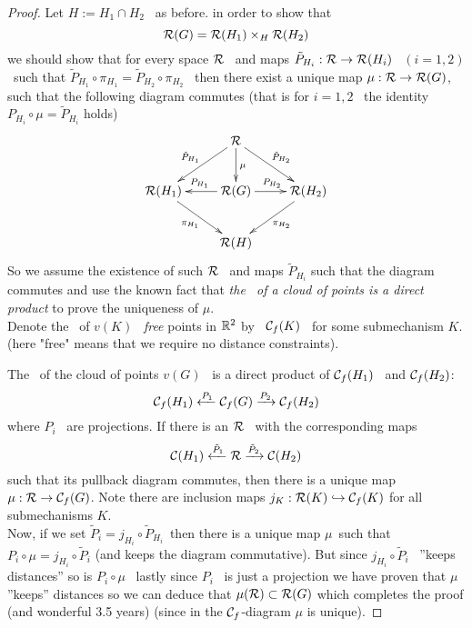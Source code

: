 \begin{proof}


Let $H:=H_1 \cap H_2$ \ as before. in order to show that
$$\mathcal{R}(G)=\mathcal{R}(H_1)\times_{H} \mathcal{R}(H_2)$$
we should show that for every space $\mathcal{R}$ \ and maps
$\tilde{P}_{H_i}:\mathcal{R} \rightarrow \mathcal{R}(H_i)$  \ $(i=1,2)$ \ such that
$\tilde{P}_{H_1}\circ \pi_{H_1}=\tilde{P}_{H_2}\circ \pi_{H_2}$ \
then there exist a unique map $\mu:\mathcal{R} \rightarrow \mathcal{R}(G)$, such
that the following diagram commutes (that is for $i=1,2$ \ the
identity $P_{H_i}\circ\mu=\tilde{P}_{H_i}$ holds)
$$
\xymatrix@R=25pt{ \hspace*{3.5mm} & \ar[dl]_{\tilde{P}_{H_1}} \R \ar[dr]^{\tilde{P}_{H_2}}\ar[d]^\mu &  \\
\R(H_1)\ar[dr]_{\pi_{H_1}} & \ar[l]_{P_{H_1}}\R(G)\ar[r]^{P_{H_2}} & \R(H_2)\ar[dl]^{\pi_{H_2}}\\
&\R(H)&}
$$
So we assume the existence of such $\mathcal{R}$ \ and maps
$\tilde{P}_{H_i}$ such that the diagram commutes and use the known
fact that \emph{the \cspace\ of a cloud of points is a direct
product} to prove the uniqueness of $\mu$.\\ Denote the \cspace \
of $v(K)$ \ \emph{free} points in ${\mathbb R}^{2}$ by \ $\mathcal{C}_{f}(K)$ \ for
some submechanism $K$. (here "free" means that we require no
distance constraints).

The \cspace \ of the cloud of points $v(G)$ \ is a direct product
of  $\mathcal{C}_f(H_1)$ \ and $\mathcal{C}_f(H_2)$:
%
$$
\mathcal{C}_f(H_{1})\xleftarrow{P_1} \mathcal{C}_f(G) \xrightarrow{P_2} \mathcal{C}_f(H_{2})
$$
where $P_i$ \ are projections. If there is an $\mathcal{R}$ \ with the
corresponding maps $$ \mathcal{C}(H_{1})\xleftarrow{\tilde{P}_1} \mathcal{R}
\xrightarrow{\tilde{P}_2} \mathcal{C}(H_{2})$$ such that its pullback
diagram commutes, then there is a unique map $\mu:\mathcal{R} \rightarrow
\mathcal{C}_f(G)$. Note there are inclusion maps $j_K:\mathcal{R}(K) \hookrightarrow \mathcal{C}_f(K)$ for all submechanisms $K$.\\

Now, if we set $\tilde{P}_i=j_{H_i} \circ \tilde{P}_{H_i}$\ then
there is a unique map $\mu$\ such that $P_i \circ \mu = j_{H_i}
\circ \tilde{P}_i$ (and keeps the diagram commutative). But since
$j_{H_i} \circ \tilde{P}_i$ \ ''keeps distances'' so is $P_i \circ
\mu$ \ lastly since $P_i$ \ is just a projection we have proven
that $\mu$ ''keeps'' distances so we can deduce that $\mu(\mathcal{R})
\subset \mathcal{R}(G)$ which completes the proof (and wonderful 3.5 years)
(since in the $\mathcal{C}_f$-diagram $\mu$ is unique).
%
\end{proof}
